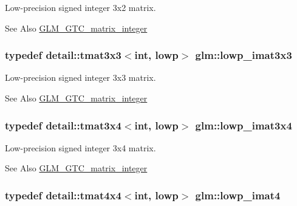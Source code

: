Low-\/precision signed integer 3x2 matrix. \begin{DoxySeeAlso}{See Also}
\hyperlink{group__gtc__matrix__integer}{G\-L\-M\-\_\-\-G\-T\-C\-\_\-matrix\-\_\-integer} 
\end{DoxySeeAlso}
\hypertarget{group__gtc__matrix__integer_gae0d6068aaf9b1f8f06c6cc32941f9471}{
\subsubsection[{lowp\-\_\-imat3x3}]{\setlength{\rightskip}{0pt plus 5cm}typedef detail\-::tmat3x3$<$int, lowp$>$ {\bf glm\-::lowp\-\_\-imat3x3}}}\label{group__gtc__matrix__integer_gae0d6068aaf9b1f8f06c6cc32941f9471}
Low-\/precision signed integer 3x3 matrix. \begin{DoxySeeAlso}{See Also}
\hyperlink{group__gtc__matrix__integer}{G\-L\-M\-\_\-\-G\-T\-C\-\_\-matrix\-\_\-integer} 
\end{DoxySeeAlso}
\hypertarget{group__gtc__matrix__integer_gaba7c2c9f782278aaa10dad882d73ef0d}{
\subsubsection[{lowp\-\_\-imat3x4}]{\setlength{\rightskip}{0pt plus 5cm}typedef detail\-::tmat3x4$<$int, lowp$>$ {\bf glm\-::lowp\-\_\-imat3x4}}}\label{group__gtc__matrix__integer_gaba7c2c9f782278aaa10dad882d73ef0d}
Low-\/precision signed integer 3x4 matrix. \begin{DoxySeeAlso}{See Also}
\hyperlink{group__gtc__matrix__integer}{G\-L\-M\-\_\-\-G\-T\-C\-\_\-matrix\-\_\-integer} 
\end{DoxySeeAlso}
\hypertarget{group__gtc__matrix__integer_ga7c687f14d923e05d5cf14aac41d10993}{
\subsubsection[{lowp\-\_\-imat4}]{\setlength{\rightskip}{0pt plus 5cm}typedef detail\-::tmat4x4$<$int, lowp$>$ {\bf glm\-::lowp\-\_\-imat4}}}\label{group__gtc__matrix__integer_ga7c687f14d923e05d5cf14aac41d10993}
